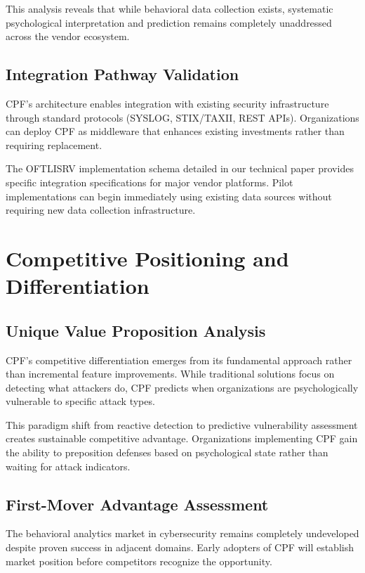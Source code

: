 \documentclass[11pt,a4paper]{article}
\begin{document}
This analysis reveals that while behavioral data collection exists, systematic psychological interpretation and prediction remains completely unaddressed across the vendor ecosystem.

\subsection{Integration Pathway Validation}

CPF's architecture enables integration with existing security infrastructure through standard protocols (SYSLOG, STIX/TAXII, REST APIs). Organizations can deploy CPF as middleware that enhances existing investments rather than requiring replacement.

The OFTLISRV implementation schema detailed in our technical paper\cite{canale2024tech} provides specific integration specifications for major vendor platforms. Pilot implementations can begin immediately using existing data sources without requiring new data collection infrastructure.

\section{Competitive Positioning and Differentiation}

\subsection{Unique Value Proposition Analysis}

CPF's competitive differentiation emerges from its fundamental approach rather than incremental feature improvements. While traditional solutions focus on detecting what attackers do, CPF predicts when organizations are psychologically vulnerable to specific attack types.

This paradigm shift from reactive detection to predictive vulnerability assessment creates sustainable competitive advantage. Organizations implementing CPF gain the ability to preposition defenses based on psychological state rather than waiting for attack indicators.

\subsection{First-Mover Advantage Assessment}

The behavioral analytics market in cybersecurity remains completely undeveloped despite proven success in adjacent domains. Early adopters of CPF will establish market position before competitors recognize the opportunity.
\end{document}

